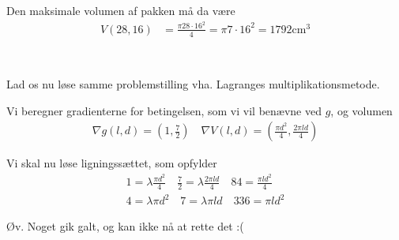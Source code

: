 \documentclass[11pt,a4paper]{article}
\newcommand{\colbreak}{\vfill{\ }\columnbreak}
\begin{document}
\begin{multicols}{2}
    Den maksimale volumen af pakken må da være
    \begin{align}
        V(28,16) &= \frac{\pi 28 \cdot 16^2}{4}
                  = \pi 7 \cdot 16^2
                  = 1792\text{cm}^3
    \end{align}

    \colbreak

    Lad os nu løse samme problemstilling vha. Lagranges multiplikationsmetode.
    
    Vi beregner gradienterne for betingelsen, som vi vil benævne ved $g$, og
    volumen
    \begin{align}
        \nabla g(l,d) = (1, \frac{7}{2})
        \quad
        \nabla V(l,d) = (\frac{\pi d^2}{4}, \frac{2\pi l d}{4})
    \end{align}
    
    Vi skal nu løse ligningssættet, som opfylder
    \begin{align}
        1 = \lambda \frac{\pi d^2}{4}
        \quad
        \frac{7}{2} = \lambda \frac{2 \pi l d}{4}
        \quad
        84 = \frac{\pi l d^2}{4}
        \\
        4 = \lambda \pi d^2
        \quad
        7 = \lambda \pi l d
        \quad
        336 = \pi l d^2
    \end{align}

    Øv. Noget gik galt, og kan ikke nå at rette det :(

\end{multicols}
\end{document}
